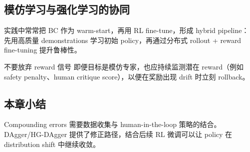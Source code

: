 \subsection{模仿学习与强化学习的协同}

实践中常常把 BC 作为 warm-start，再用 RL fine-tune，形成 hybrid pipeline：先用高质量 demonstrations 学习初始 policy，再通过分布式 rollout + reward fine-tuning 提升鲁棒性。

\begin{warningbox}{不要放弃 reward 信号}
即便目标是模仿专家，也应持续监测潜在 reward（例如 safety penalty、human critique score），以便在奖励出现 drift 时立刻 rollback。
\end{warningbox}

\subsection{本章小结}

Compounding errors 需要数据收集与 human-in-the-loop 策略的结合。DAgger/HG-DAgger 提供了修正路径，结合后续 RL 微调可以让 policy 在 distribution shift 中继续收敛。


